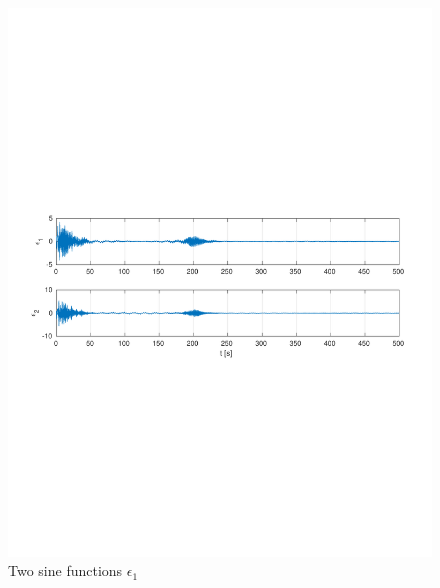 \documentclass[]{article}
\begin{document}
\begin{figure}[H]
\centering
\includegraphics[width=1\columnwidth]{two_sine_error.pdf}
\caption{Two sine functions $\epsilon_1$}
\label{fig:two_sine_error}
\end{figure}
\end{document}
